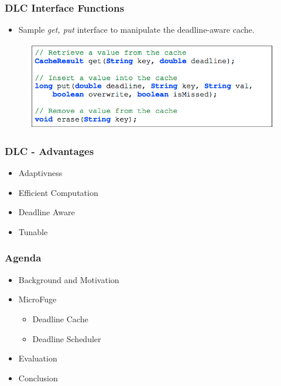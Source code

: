 \documentclass{beamer}
\begin{document}
\begin{frame}
  \frametitle{DLC Interface Functions}
  \begin{itemize}
    \item Sample \textit{get, put} interface to manipulate the deadline-aware cache.
  \end{itemize}
  \begin{figure}
    \begin{center}
      \centerline{\includegraphics[scale=0.45]{img/DLC_interface.png}}
    \end{center}
  \end{figure}
\end{frame}

\begin{frame}
  \frametitle{DLC - Advantages}
  \begin{itemize}
  \item Adaptivness
  \item Efficient Computation
  \item Deadline Aware
  \item Tunable
  \end{itemize}
\end{frame}

\begin{frame}
  \frametitle{Agenda}
  \begin{itemize}
  \item[\Checkmark] Background and Motivation
  \item MicroFuge
    \begin{itemize}
    \item[\Checkmark] Deadline Cache
    \item Deadline Scheduler
    \end{itemize}
  \item Evaluation
  \item Conclusion
  \end{itemize}
\end{frame}
\end{document}
